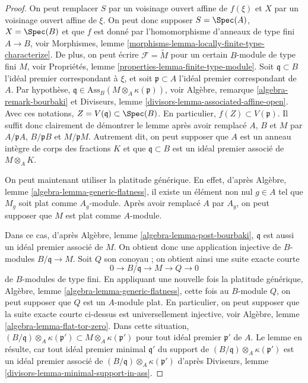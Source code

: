 \begin{proof}
On peut remplacer $S$ par un voisinage ouvert affine de $f(\xi)$
et $X$ par un voisinage ouvert affine de $\xi$. On peut donc supposer
$S = \Spec(A)$, $X = \Spec(B)$ et que $f$ est donné par
l'homomorphisme d'anneaux de type fini $A \to B$, voir
Morphismes, lemme \ref{morphisms-lemma-locally-finite-type-characterize}.
De plus, on peut écrire $\mathcal{F} = \widetilde{M}$ pour un certain
$B$-module de type fini $M$, voir
Propriétés, lemme \ref{properties-lemma-finite-type-module}.
Soit $\mathfrak q \subset B$ l'idéal premier correspondant à $\xi$, et
soit $\mathfrak p \subset A$ l'idéal premier correspondant de $A$.
Par hypothèse, $\mathfrak q \in \text{Ass}_B(M \otimes_A \kappa(\mathfrak p))$,
voir
Algèbre, remarque \ref{algebra-remark-bourbaki}
et
Diviseurs, lemme \ref{divisors-lemma-associated-affine-open}.
Avec ces notations, $Z = V(\mathfrak q) \subset \Spec(B)$.
En particulier, $f(Z) \subset V(\mathfrak p)$. Il suffit donc clairement de
démontrer le lemme après avoir remplacé $A$, $B$ et $M$ par
$A/\mathfrak pA$, $B/\mathfrak pB$ et $M/\mathfrak pM$.
Autrement dit, on peut supposer que $A$ est un anneau intègre de corps des fractions
$K$ et que $\mathfrak q \subset B$ est un idéal premier associé de $M \otimes_A K$.

\medskip\noindent
On peut maintenant utiliser la platitude générique. En effet, d'après
Algèbre, lemme \ref{algebra-lemma-generic-flatness},
il existe un élément non nul $g \in A$ tel que $M_g$ soit plat
comme $A_g$-module. Après avoir remplacé $A$ par $A_g$, on peut supposer que
$M$ est plat comme $A$-module.

\medskip\noindent
Dans ce cas, d'après
Algèbre, lemme \ref{algebra-lemma-post-bourbaki},
$\mathfrak q$ est aussi un idéal premier associé de $M$.
On obtient donc une application injective de $B$-modules $B/\mathfrak q \to M$.
Soit $Q$ son conoyau ; on obtient ainsi une suite exacte courte
$$
0 \to B/\mathfrak q \to M \to Q \to 0
$$
de $B$-modules de type fini. En appliquant une nouvelle fois la platitude générique,
Algèbre, lemme \ref{algebra-lemma-generic-flatness},
cette fois au $B$-module $Q$, on peut supposer que $Q$
est un $A$-module plat. En particulier, on peut supposer que la suite exacte
courte ci-dessus est universellement injective, voir
Algèbre, lemme \ref{algebra-lemma-flat-tor-zero}.
Dans cette situation,
$(B/\mathfrak q) \otimes_A \kappa(\mathfrak p')
\subset M \otimes_A \kappa(\mathfrak p')$
pour tout idéal premier $\mathfrak p'$ de $A$. Le lemme en résulte, car tout idéal
premier minimal $\mathfrak q'$ du support de
$(B/\mathfrak q) \otimes_A \kappa(\mathfrak p')$
est un idéal premier associé de $(B/\mathfrak q) \otimes_A \kappa(\mathfrak p')$ d'après
Diviseurs, lemme \ref{divisors-lemma-minimal-support-in-ass}.
\end{proof}


